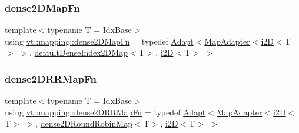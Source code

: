 \subsubsection{\texorpdfstring{dense2\+D\+Map\+Fn}{dense2DMapFn}}
{\footnotesize\ttfamily template$<$typename T  = Idx\+Base$>$ \\
using \hyperlink{namespacevt_1_1mapping_afea13b390fab1d1388658ed759f9f44f}{vt\+::mapping\+::dense2\+D\+Map\+Fn} = typedef \hyperlink{namespacevt_1_1mapping_aafe187035ce8df02f31983e37cdb6a5d}{Adapt}$<$\hyperlink{namespacevt_1_1mapping_a41b113c28bb6430fbcb5be66e08ccf9f}{Map\+Adapter}$<$\hyperlink{namespacevt_1_1mapping_a6448c875e0807b43f31e96fc5b0cec04}{i2D}$<$T$>$ $>$, \hyperlink{namespacevt_1_1mapping_a011c4e2cb832d3edcd98e3803d405ad4}{default\+Dense\+Index2\+D\+Map}$<$T$>$, \hyperlink{namespacevt_1_1mapping_a6448c875e0807b43f31e96fc5b0cec04}{i2D}$<$T$>$ $>$}

\mbox{\label{namespacevt_1_1mapping_a7a86c7f1af7a323cd67e97e8897804e4}} 
\subsubsection{\texorpdfstring{dense2\+D\+R\+R\+Map\+Fn}{dense2DRRMapFn}}
{\footnotesize\ttfamily template$<$typename T  = Idx\+Base$>$ \\
using \hyperlink{namespacevt_1_1mapping_a7a86c7f1af7a323cd67e97e8897804e4}{vt\+::mapping\+::dense2\+D\+R\+R\+Map\+Fn} = typedef \hyperlink{namespacevt_1_1mapping_aafe187035ce8df02f31983e37cdb6a5d}{Adapt}$<$\hyperlink{namespacevt_1_1mapping_a41b113c28bb6430fbcb5be66e08ccf9f}{Map\+Adapter}$<$\hyperlink{namespacevt_1_1mapping_a6448c875e0807b43f31e96fc5b0cec04}{i2D}$<$T$>$ $>$, \hyperlink{namespacevt_1_1mapping_ac606a5886c93a4dbb05dfead285c30c6}{dense2\+D\+Round\+Robin\+Map}$<$T$>$, \hyperlink{namespacevt_1_1mapping_a6448c875e0807b43f31e96fc5b0cec04}{i2D}$<$T$>$ $>$}

\mbox{\label{namespacevt_1_1mapping_a20b151291c38fe5008608b65f28759ac}} 

